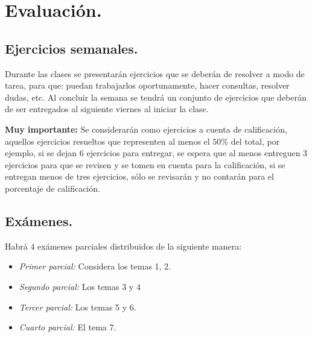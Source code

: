 \documentclass[12pt]{article}
\begin{document}
\section{Evaluación.}
\subsection{Ejercicios semanales.}
Durante las clases se presentarán ejercicios que se deberán de resolver a modo de tarea, para que: puedan trabajarlos oportunamente, hacer consultas, resolver dudas, etc. Al concluir la semana se tendrá un conjunto de ejercicios que deberán de ser entregados al siguiente viernes al iniciar la clase.
\par
\textbf{Muy importante:} Se considerarán como ejercicios a cuenta de calificación, aquellos ejercicios resueltos que representen al menos el $50\%$ del total, por ejemplo, si se dejan 6 ejercicios para entregar, se espera que al menos entreguen 3 ejercicios para que se revisen y se tomen en cuenta para la calificación, si se entregan menos de tres ejercicios, sólo se revisarán y no contarán para el porcentaje de calificación.
\subsection{Exámenes.}
Habrá 4 exámenes parciales distribuidos de la siguiente manera:
\begin{itemize}
\item \emph{Primer parcial:} Considera los temas 1, 2.
\item \emph{Segundo parcial:} Los temas 3 y 4
\item \emph{Tercer parcial:} Los temas 5 y 6.
\item \emph{Cuarto parcial:} El tema 7.
\end{itemize}
\end{document}
